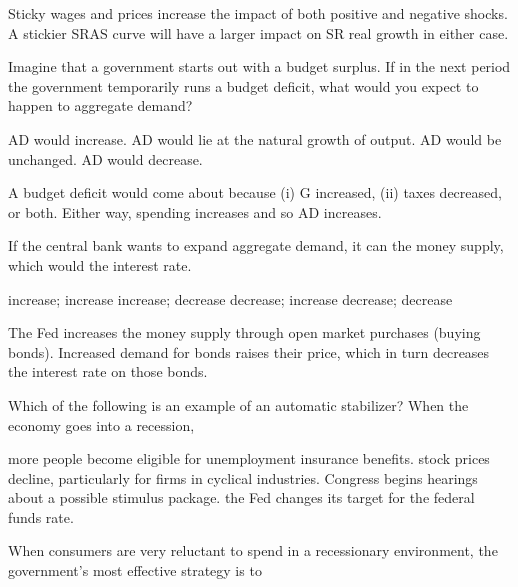 \documentclass[addpoints,11pt]{exam}
\theoremstyle{definition}
\newcommand{\blank}[0]{\underline{\hspace{3cm}}}
\begin{document}
\begin{questions}
\begin{solution}
	Sticky wages and prices increase the impact of both positive and negative shocks. A stickier SRAS curve will have a larger impact on SR real growth in either case.
\end{solution}

\question Imagine that a government starts out with a budget surplus. If in the next period the government temporarily runs a budget deficit, what would you expect to happen to aggregate demand?

\begin{choices}
	\CorrectChoice AD would increase.
	\choice AD would lie at the natural growth of output.
	\choice AD would be unchanged.
	\choice AD would decrease. 
\end{choices}

\begin{solution}
	A budget deficit would come about because (i) G increased, (ii) taxes decreased, or both. Either way, spending increases and so AD increases.
\end{solution}


\question If the central bank wants to expand aggregate demand, it can \blank the money supply, which would \blank the interest rate.

\begin{choices}
	\choice increase; increase
	\CorrectChoice increase; decrease
	\choice decrease; increase
	\choice decrease; decrease
\end{choices}

\begin{solution}
	The Fed increases the money supply through open market purchases (buying bonds). Increased demand for bonds raises their price, which in turn decreases the interest rate on those bonds.
\end{solution}

\question Which of the following is an example of an automatic stabilizer? When the economy goes into a recession,

\begin{choices}
	\CorrectChoice more people become eligible for unemployment insurance benefits.
	\choice stock prices decline, particularly for firms in cyclical industries.
	\choice Congress begins hearings about a possible stimulus package.
	\choice the Fed changes its target for the federal funds rate.
\end{choices}



\question When consumers are very reluctant to spend in a recessionary environment, the government's most effective strategy is to 


\end{questions}
\end{document}
